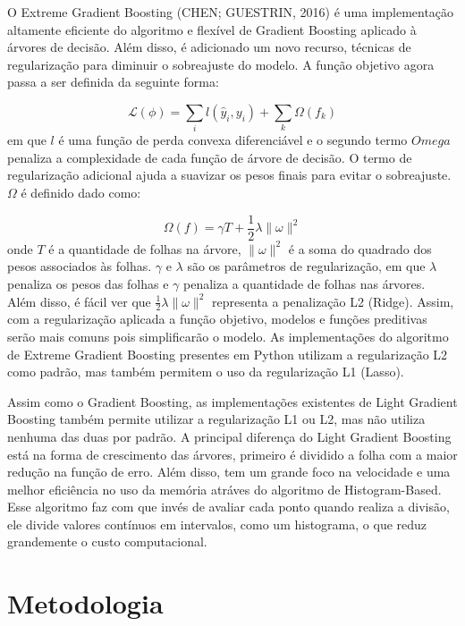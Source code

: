 \documentclass[
  12pt,
  a4paper,
]{scrreprt}
\begin{document}
O Extreme Gradient Boosting (CHEN; GUESTRIN, 2016) é uma implementação
altamente eficiente do algoritmo e flexível de Gradient Boosting
aplicado à árvores de decisão. Além disso, é adicionado um novo recurso,
técnicas de regularização para diminuir o sobreajuste do modelo. A
função objetivo agora passa a ser definida da seguinte forma:

\[
\mathcal{L}\left(\phi\right) = \sum_{i}l\left(\hat{y}_{i}, y_{i}\right) + \sum_{k}\Omega\left(f_{k}\right)
\] em que \(l\) é uma função de perda convexa diferenciável e o segundo
termo \(Omega\) penaliza a complexidade de cada função de árvore de
decisão. O termo de regularização adicional ajuda a suavizar os pesos
finais para evitar o sobreajuste. \(\Omega\) é definido dado como:

\[
\Omega\left(f\right) = \gamma T + \frac{1}{2}\lambda\|\omega\|^{2}
\] onde \(T\) é a quantidade de folhas na árvore, \(\|\omega\|^{2}\) é a
soma do quadrado dos pesos associados às folhas. \(\gamma\) e
\(\lambda\) são os parâmetros de regularização, em que \(\lambda\)
penaliza os pesos das folhas e \(\gamma\) penaliza a quantidade de
folhas nas árvores. Além disso, é fácil ver que
\(\frac{1}{2}\lambda\|\omega\|^{2}\) representa a penalização L2
(Ridge). Assim, com a regularização aplicada a função objetivo, modelos
e funções preditivas serão mais comuns pois simplificarão o modelo. As
implementações do algoritmo de Extreme Gradient Boosting presentes em
Python utilizam a regularização L2 como padrão, mas também permitem o
uso da regularização L1 (Lasso).

\vspace{12pt}

Assim como o Gradient Boosting, as implementações existentes de Light
Gradient Boosting também permite utilizar a regularização L1 ou L2, mas
não utiliza nenhuma das duas por padrão. A principal diferença do Light
Gradient Boosting está na forma de crescimento das árvores, primeiro é
dividido a folha com a maior redução na função de erro. Além disso, tem
um grande foco na velocidade e uma melhor eficiência no uso da memória
atráves do algoritmo de Histogram-Based. Esse algoritmo faz com que
invés de avaliar cada ponto quando realiza a divisão, ele divide valores
contínuos em intervalos, como um histograma, o que reduz grandemente o
custo computacional.

\chapter{Metodologia}\label{metodologia}
\end{document}
